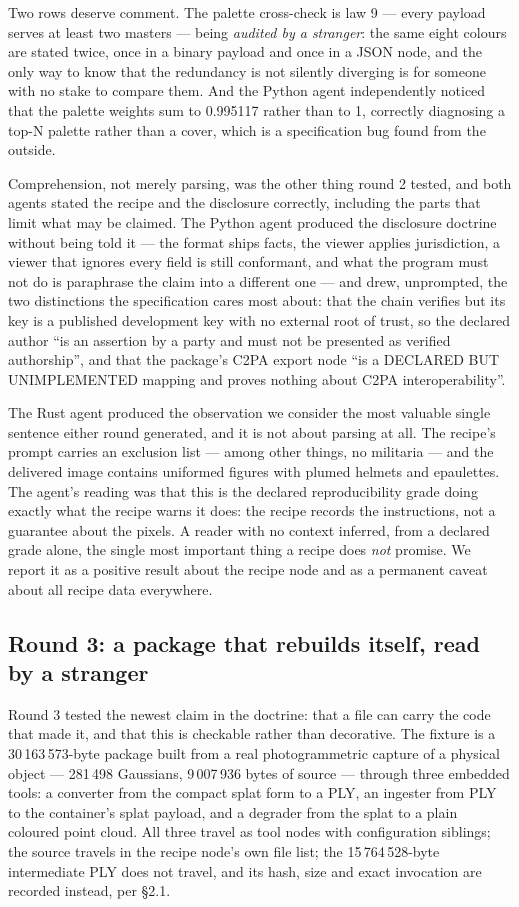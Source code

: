 \documentclass[10pt,twocolumn,letterpaper]{article}
\begin{document}
Two rows deserve comment. The palette cross-check is law 9 --- every payload serves at least two masters --- being \emph{audited by a stranger}: the same eight colours are stated twice, once in a binary payload and once in a JSON node, and the only way to know that the redundancy is not silently diverging is for someone with no stake to compare them. And the Python agent independently noticed that the palette weights sum to 0.995117 rather than to 1, correctly diagnosing a top-N palette rather than a cover, which is a specification bug found from the outside.

Comprehension, not merely parsing, was the other thing round 2 tested, and both agents stated the recipe and the disclosure correctly, including the parts that limit what may be claimed. The Python agent produced the disclosure doctrine without being told it --- the format ships facts, the viewer applies jurisdiction, a viewer that ignores every field is still conformant, and what the program must not do is paraphrase the claim into a different one --- and drew, unprompted, the two distinctions the specification cares most about: that the chain verifies but its key is a published development key with no external root of trust, so the declared author ``is an assertion by a party and must not be presented as verified authorship'', and that the package's C2PA export node ``is a DECLARED BUT UNIMPLEMENTED mapping and proves nothing about C2PA interoperability''.

The Rust agent produced the observation we consider the most valuable single sentence either round generated, and it is not about parsing at all. The recipe's prompt carries an exclusion list --- among other things, no militaria --- and the delivered image contains uniformed figures with plumed helmets and epaulettes. The agent's reading was that this is the declared reproducibility grade doing exactly what the recipe warns it does: the recipe records the instructions, not a guarantee about the pixels. A reader with no context inferred, from a declared grade alone, the single most important thing a recipe does \emph{not} promise. We report it as a positive result about the recipe node and as a permanent caveat about all recipe data everywhere.

\subsection{Round 3: a package that rebuilds itself, read by a stranger}

Round 3 tested the newest claim in the doctrine: that a file can carry the code that made it, and that this is checkable rather than decorative. The fixture is a 30\,163\,573-byte package built from a real photogrammetric capture of a physical object --- 281\,498 Gaussians, 9\,007\,936 bytes of source --- through three embedded tools: a converter from the compact splat form to a PLY, an ingester from PLY to the container's splat payload, and a degrader from the splat to a plain coloured point cloud. All three travel as tool nodes with configuration siblings; the source travels in the recipe node's own file list; the 15\,764\,528-byte intermediate PLY does not travel, and its hash, size and exact invocation are recorded instead, per \S2.1.
\end{document}
